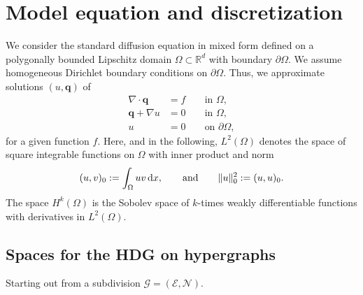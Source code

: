 \documentclass[a4paper, english, 12pt, reqno, draft]{amsart}
\theoremstyle{definition}
\theoremstyle{remark}
\numberwithin{equation}{section}
\newcommand{\graph}{\ensuremath{\mathcal G}}
\newcommand{\setEdge}{\ensuremath{\mathcal E}}
\newcommand{\setNode}{\ensuremath{\mathcal N}}
\newcommand{\Div}{\nabla\!\cdot\!}
\renewcommand{\vec}[1]{\ensuremath{\boldsymbol{#1}}}
\newcommand{\Nu}{\ensuremath{\vec \nu}}
\newcommand{\dx}{\ensuremath{\, \textup d x}}
\begin{document}
\section{Model equation and discretization}\label{SEC:basics}
% 
We consider the standard diffusion equation in mixed form defined on a polygonally bounded Lipschitz domain $\Omega \subset \mathbb R^d$ with boundary $\partial \Omega$. We assume homogeneous Dirichlet boundary conditions on $\partial\Omega$. Thus, we approximate solutions $(u, \vec q)$ of
% 
\begin{subequations}\label{EQ:diffusion_mixed}
\begin{align}
 \Div \vec q & = f && \text{ in } \Omega,\\
 \vec q + \nabla u & = 0 && \text{ in } \Omega,\\
 u & = 0 && \text{ on } \partial \Omega,%
\end{align}
\end{subequations}
% 
for a given function $f$. Here, and in the following, $L^2(\Omega)$ denotes the space of square integrable functions on $\Omega$ with inner product and norm
\begin{equation}
 (u,v)_0 := \int_\Omega u v \dx, \qquad \text{and} \qquad \| u \|^2_0 := (u,u)_0.
\end{equation}
%
The space $H^k(\Omega)$ is the Sobolev space of $k$-times weakly
differentiable functions with derivatives in $L^2(\Omega)$.
% 
\subsection{Spaces for the HDG on hypergraphs}
%
Starting out from a subdivision $\graph = (\setEdge, \setNode)$.
\end{document}
